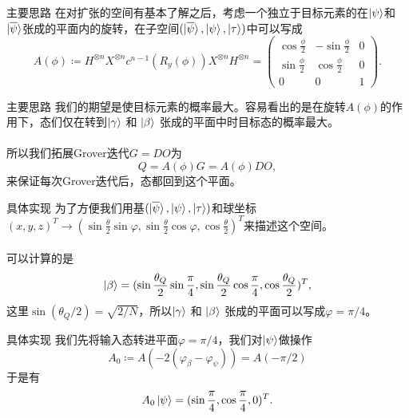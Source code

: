 \documentclass{beamer}
\begin{document}
\begin{frame}{主要思路}
    在对扩张的空间有基本了解之后，考虑一个独立于目标元素的在$\ket{\psi}$和$\ket{\overline{\psi}}$张成的平面内的旋转，在子空间$(\ket{\overline{\psi}},\ket{\psi},\ket{\tau})$中可以写成
    \begin{equation*}
        A(\phi)\coloneqq H^{\otimes n}X^{\otimes n}c^{n-1}\left(R_{y}(\phi)\right)X^{\otimes n}H^{\otimes n}=
        \begin{pmatrix}
            \cos\frac{\phi}{2} & -\sin\frac{\phi}{2} & 0 \\
            \sin\frac{\phi}{2} & \cos\frac{\phi}{2}  & 0 \\
            0                  & 0                   & 1
        \end{pmatrix}
        .
    \end{equation*}
\end{frame}

\begin{frame}{主要思路}
    我们的期望是使目标元素的概率最大。容易看出的是在旋转$A(\phi)$的作用下，态们仅在转到$\ket{\gamma}$ 和 $\ket{\beta}$ 张成的平面中时目标态的概率最大。\\~\\

    所以我们拓展Grover迭代$G=DO$为
    \begin{equation}
        Q=A(\phi)G=A(\phi)DO,
    \end{equation}
    来保证每次Grover迭代后，态都回到这个平面。
\end{frame}

\begin{frame}{具体实现}
    为了方便我们用基$(\ket{\overline{\psi}},\ket{\psi},\ket{\tau})$和球坐标$(x,y,z)^{T}\to(\sin\frac{\theta}{2}\sin\varphi,\sin\frac{\theta}{2}\cos\varphi,\cos\frac{\theta}{2})^{T}$来描述这个空间。\\~\\

    可以计算的是
    \begin{equation}
        \ket{\beta}=(\sin\frac{\theta_{Q}}{2}\sin\frac{\pi}{4},\sin\frac{\theta_{Q}}{2}\cos\frac{\pi}{4},\cos\frac{\theta_{Q}}{2})^{T},
    \end{equation}
    这里$\sin(\theta_{Q}/2)=\sqrt{2/N}$，所以$\ket{\gamma}$ 和 $\ket{\beta}$ 张成的平面可以写成$\varphi=\pi/4$。
\end{frame}

\begin{frame}{具体实现}
    我们先将输入态转进平面$\varphi=\pi/4$，我们对$\ket{\psi}$做操作
    \begin{equation}
        A_{0}\coloneqq A(-2(\varphi_{\beta}-\varphi_{\psi}))=A(-\pi/2)
    \end{equation}
    于是有
    \begin{equation}
        A_{0}\ket{\psi}=(\sin\frac{\pi}{4},\cos\frac{\pi}{4},0)^{T}.
    \end{equation}
\end{frame}
\end{document}
